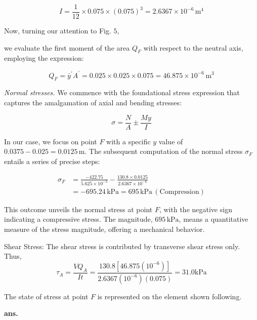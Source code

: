 \documentclass[12pt]{article}
\begin{document}
\[
I = \frac{1}{12} \times 0.075 \times (0.075)^3 = 2.6367 \times 10^{-6} \, \mathrm{m}^4
\]

Now, turning our attention to Fig. \(5\),


\begin{figure}[!ht]
    \centering
    
    \caption{}
\end{figure}


we evaluate the first moment of the area \(Q_F\) with respect to the neutral axis, employing the expression:

\[
Q_F = \bar{y}^{\prime} A^{\prime} = 0.025 \times 0.025 \times 0.075 = 46.875 \times 10^{-6} \, \mathrm{m}^3
\]

\textit{Normal stresses.} We commence with the foundational stress expression that captures the amalgamation of axial and bending stresses:

\[
\sigma = \frac{N}{A} \pm \frac{M y}{I}
\]

In our case, we focus on point \(F\) with a specific \(y\) value of \(0.0375 - 0.025 = 0.0125 \, \mathrm{m}\). The subsequent computation of the normal stress \(\sigma_F\) entails a series of precise steps:

\[ \begin{aligned}
\sigma_F & = \frac{-422.75}{5.625 \times 10^{-3}} - \frac{130.8 \times 0.0125}{2.6367 \times 10^{-6}} \\
& = -695.24 \, \mathrm{kPa} = 695 \, \mathrm{kPa} \, (\mathrm{Compression})
\end{aligned} \]
\AnswerTag

This outcome unveils the normal stress at point \(F\), with the negative sign indicating a compressive stress. The magnitude, \(695 \, \mathrm{kPa}\), means a quantitative measure of the stress magnitude, offering a mechanical behavior. 


Shear Stress: The shear stress is contributed by transverse shear stress only. Thus,
\[
\tau_A=\frac{V Q_A}{I t}=\frac{130.8\left[46.875\left(10^{-6}\right)\right]}{2.6367\left(10^{-6}\right)(0.075)}=31.0 \mathrm{kPa}
\]

\AnswerTag

The state of stress at point \(F\) is represented on the element shown following.


\begin{figure}[!ht]
    \centering
    
    \caption{}
\end{figure}
\begin{flushright}
\textbf{ans.}
\end{flushright}
\end{document}
